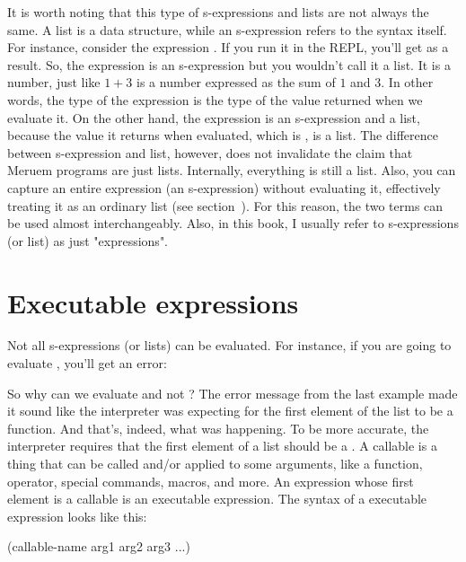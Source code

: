 It is worth noting that this type of s-expressions and lists are not always the same. A list is a data structure, while an s-expression refers to the syntax itself. For instance, consider the expression . If you run it in the REPL, you'll get  as a result. So, the expression  is an s-expression but you wouldn't call it a list. It is a number, just like $1 + 3$ is a number expressed as the sum of $1$ and $3$. In other words, the type of the expression is the type of the value returned when we evaluate it. On the other hand, the expression  is an s-expression and a list, because the value it returns when evaluated, which is , is a list. The difference between s-expression and list, however, does not invalidate the claim that Meruem programs are just lists. Internally, everything is still a list. Also, you can capture an entire expression (an s-expression) without evaluating it, effectively treating it as an ordinary list (see section~). For this reason, the two terms can be used almost interchangeably. Also, in this book, I usually refer to s-expressions (or list) as just "expressions".

\section{Executable expressions}
Not all s-expressions (or lists) can be evaluated. For instance, if you are going to evaluate , you'll get an error:

\begin{REPL}
meruem> (1 2 3)
An error has occurred. 1 can not be converted to a function.
Source: .home.melvic.meruem.meruem.prelude [1:2}]
(1 2 3)
 ^
\end{REPL}

So why can we evaluate  and not ? The error message from the last example made it sound like the interpreter was expecting for the first element of the list to be a function. And that's, indeed, what was happening. To be more accurate, the interpreter requires that the first element of a list should be a . A callable is a thing that can be called and/or applied to some arguments, like a function, operator, special commands, macros, and more. An expression whose first element is a callable is an executable expression. The syntax of a executable expression looks like this:

\begin{QuasiLang}
(callable-name arg1 arg2 arg3 ...)
\end{QuasiLang}


